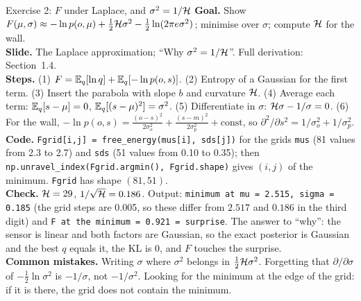 \documentclass[11pt]{article}
\begin{document}
\begin{labhelp}{Exercise 2: $F$ under Laplace, and $\sigma^2=1/\mathcal{H}$}
\textbf{Goal.} Show $F(\mu,\sigma)\approx-\ln p(o,\mu)+\tfrac12\mathcal{H}\sigma^2-\tfrac12\ln(2\pi e\sigma^2)$; minimise over $\sigma$; compute $\mathcal{H}$ for the wall.\\
\textbf{Slide.} The Laplace approximation; ``Why $\sigma^2=1/\mathcal{H}$''. Full derivation: Section~1.4.\\
\textbf{Steps.} (1) $F = \mathbb{E}_q[\ln q] + \mathbb{E}_q[-\ln p(o,s)]$. (2) Entropy of a Gaussian for the first term. (3) Insert the parabola with slope $b$ and curvature $\mathcal{H}$. (4) Average each term: $\mathbb{E}_q[s-\mu]=0$, $\mathbb{E}_q[(s-\mu)^2]=\sigma^2$. (5) Differentiate in $\sigma$: $\mathcal{H}\sigma-1/\sigma=0$. (6) For the wall, $-\ln p(o,s)=\frac{(o-s)^2}{2\sigma_o^2}+\frac{(s-m)^2}{2\sigma_p^2}+\text{const}$, so $\partial^2/\partial s^2 = 1/\sigma_o^2 + 1/\sigma_p^2$.\\
\textbf{Code.} \texttt{Fgrid[i,j] = free\_energy(mus[i], sds[j])} for the grids \texttt{mus} (81 values from 2.3 to 2.7) and \texttt{sds} (51 values from 0.10 to 0.35); then \texttt{np.unravel\_index(Fgrid.argmin(), Fgrid.shape)} gives $(i,j)$ of the minimum. \texttt{Fgrid} has shape $(81,51)$.\\
\textbf{Check.} $\mathcal{H}=29$, $1/\sqrt{\mathcal{H}}=0.186$. Output: \texttt{minimum at mu = 2.515, sigma = 0.185} (the grid steps are 0.005, so these differ from $2.517$ and $0.186$ in the third digit) and \texttt{F at the minimum = 0.921 = surprise}. The answer to ``why'': the sensor is linear and both factors are Gaussian, so the exact posterior is Gaussian and the best $q$ equals it, the KL is $0$, and $F$ touches the surprise.\\
\textbf{Common mistakes.} Writing $\sigma$ where $\sigma^2$ belongs in $\tfrac12\mathcal{H}\sigma^2$. Forgetting that $\partial/\partial\sigma$ of $-\tfrac12\ln\sigma^2$ is $-1/\sigma$, not $-1/\sigma^2$. Looking for the minimum at the edge of the grid: if it is there, the grid does not contain the minimum.
\end{labhelp}
\end{document}

